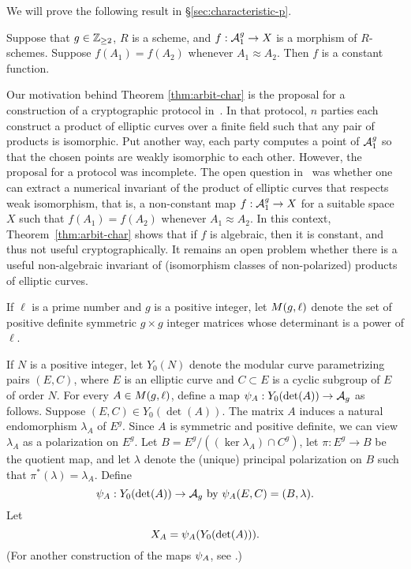 \documentclass{amsart}
\begin{document}
We will prove the following result in \S\ref{sec:characteristic-p}.
\begin{theorem}\label{thm:arbit-char}
  Suppose that $g\in\mathbb{Z}_{\ge 2}$, $R$ is a scheme, and $f: \mathcal{A}_1^g \to X$ is a morphism of $R$-schemes. Suppose $f(A_1) = f(A_2)$ whenever $A_1 \approx A_2$. Then $f$ is a constant function.
\end{theorem}

Our motivation behind Theorem \ref{thm:arbit-char} is the proposal for a construction of a cryptographic protocol in~\cite{multiparty}. In that protocol, $n$ parties each construct a product of elliptic curves over a finite field such that any pair of products is isomorphic. Put another way, each party computes a point of $\mathcal{A}_1^g$ so that the chosen points are weakly isomorphic to each other. However, the proposal for a protocol was incomplete. The open question in~\cite{multiparty} was whether one can extract a numerical invariant of the product of elliptic curves that respects weak isomorphism, that is, a non-constant map $f: \mathcal{A}_1^g \to X$ for a suitable space $X$ such that $f(A_1) = f(A_2)$ whenever $A_1 \approx A_2$. In this context, Theorem~\ref{thm:arbit-char} shows that if $f$ is algebraic, then it is constant, and thus not useful cryptographically. It remains an open problem whether there is a useful non-algebraic invariant of (isomorphism classes of non-polarized) products of elliptic curves.


\begin{definition}\label{def:detl}
If $\ell$ is a prime number and $g$ is a positive integer, let $M(g,\ell)$ denote the set of positive definite symmetric $g \times g$ integer matrices whose determinant is a power of $\ell$.
\end{definition}

If $N$ is a positive integer, let $Y_0(N)$ denote the modular curve parametrizing pairs $(E, C)$, where $E$ is an elliptic curve and $C \subset E$ is a cyclic subgroup of $E$ of order $N$. For every $A \in M(g,\ell)$, define a map $\psi_{A}: Y_0(\det(A)) \to \mathcal{A}_g$ as follows. Suppose $(E, C) \in Y_0(\det(A))$. The matrix $A$ induces a natural endomorphism $\lambda_A$ of $E^g$. Since $A$ is symmetric and positive definite, we can view $\lambda_A$ as a polarization on $E^g$. Let $B = E^g/((\ker \lambda_A) \cap C^g)$, let $\pi: E^g \to B$ be the quotient map, and let $\lambda$ denote the (unique) principal polarization on $B$ such that $\pi^*(\lambda) = \lambda_A$. Define
\begin{equation}\label{def:psimoddef}
\psi_{A}: Y_0(\det(A)) \to \mathcal{A}_g  \text{ by } \psi_{A}(E,C) = (B,\lambda).
\end{equation}
Let
\begin{equation}\label{def:XAdef}
X_A=\psi_{A}(Y_0(\det(A))).
\end{equation}
(For another construction of the maps $\psi_{A}$, see \cite[p. 19 et seq.]{rains}.)
\end{document}
